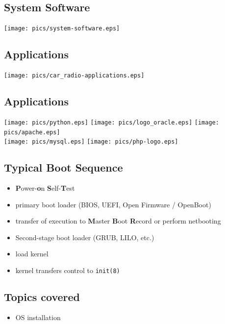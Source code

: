 \documentclass[xga]{xdvislides}
\begin{document}
\subsection{System Software}
\begin{center}
	\texttt{[image: pics/system-software.eps]}
\end{center}

\subsection{Applications}
\begin{center}
	\texttt{[image: pics/car\_radio-applications.eps]}
\end{center}

\subsection{Applications}
\begin{center}
	\texttt{[image: pics/python.eps]}
	\texttt{[image: pics/logo\_oracle.eps]}
	\texttt{[image: pics/apache.eps]} \\
	\texttt{[image: pics/mysql.eps]}
	\texttt{[image: pics/php-logo.eps]}
\end{center}

\subsection{Typical Boot Sequence}
\begin{itemize}
	\item {\bf P}ower-{\bf o}n {\bf S}elf-{\bf T}est
	\item primary boot loader (BIOS, UEFI, Open Firmware / OpenBoot)
	\item transfer of execution to {\bf M}aster {\bf B}oot {\bf R}ecord or perform netbooting
	\item Second-stage boot loader (GRUB, LILO, etc.)
	\item load kernel
	\item kernel transfers control to {\tt init(8)}
\end{itemize}

\subsection{Topics covered}
\begin{itemize}
	\item OS installation
\end{itemize}
\end{document}
